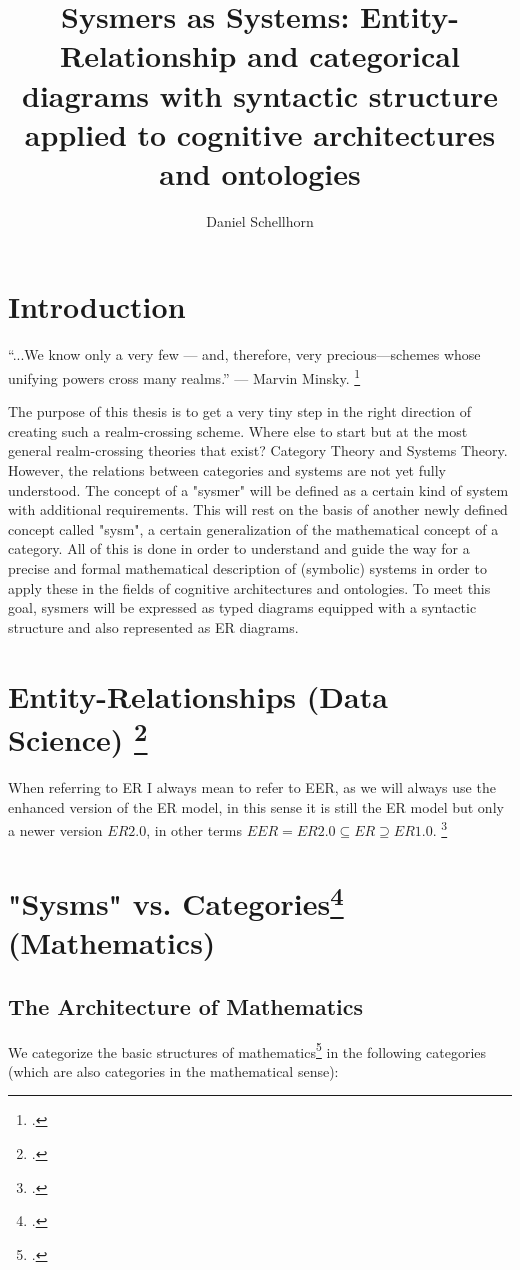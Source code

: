 \documentclass[12pt,a4paper]{article}
\title{Sysmers as Systems: Entity-Relationship and categorical diagrams with syntactic structure applied to cognitive architectures and ontologies}
\author{Daniel Schellhorn}
\begin{document}
\maketitle

\section*{Introduction}
“...We know only a very few — and, therefore, very precious—schemes whose unifying powers cross many realms.” — Marvin Minsky. \footcite[?]{Minsky1988}
\newline

The purpose of this thesis is to get a very tiny step in the right direction of creating such a realm-crossing scheme.  Where else to start but at the most general realm-crossing theories that exist? Category Theory and Systems Theory. However, the relations between categories and systems are not yet fully understood. The concept of a "sysmer" will be defined as a certain kind of system with additional requirements. This will rest on the basis of another newly defined concept called "sysm", a certain generalization of the mathematical concept of a category. All of this is done in order to understand and guide the way for a precise and formal mathematical description of (symbolic) systems in order to apply these in the fields of cognitive architectures and ontologies. To meet this goal, sysmers will be expressed as typed diagrams equipped with a syntactic structure and also represented as ER diagrams.
\section{Entity-Relationships (Data Science) \footcite{ElmasriNavathe2015}}

When referring to ER I always mean to refer to EER, as we will always use the enhanced version of the ER model, in this sense it is still the ER model but only a newer version $ER 2.0$, in other terms $EER = ER 2.0 \subseteq ER \supseteq ER 1.0 $. \footcite[107]{ElmasriNavathe2015}

\section{"Sysms" vs. Categories\footcite{MacLane1997} (Mathematics)}

\subsection{The Architecture of Mathematics}
We categorize the basic structures of mathematics\footcite[68]{Basieux2000} in the following categories (which are also categories in the mathematical sense):
\end{document}

